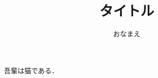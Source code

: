 \documentclass[a4paper]{ltjsarticle}
\title{タイトル}
\author{おなまえ}
\begin{document}
\maketitle
吾輩は猫である．
\end{document}
